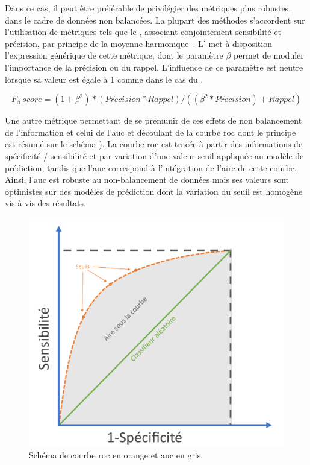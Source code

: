 Dans ce cas, il peut être préférable de privilégier des métriques plus robustes, dans le cadre de données non balancées. La plupart des méthodes s’accordent sur l’utilisation de métriques tels que le \fscore{}, associant conjointement sensibilité et précision, par principe de la moyenne harmonique~\cite{Guo2008}. L' met à disposition l'expression générique de cette métrique, dont le paramètre $\beta$ permet de moduler l'importance de la précision ou du rappel. L'influence de ce paramètre est neutre lorsque sa valeur est égale à 1 comme dans le cas du \fscore.\par
 
\begin{equation} 
    {F_\beta \: score}=(1+\beta^2)*(Pr\acute{e}cision*Rappel)/((\beta^2*Pr\acute{e}cision)+Rappel)
    \label{eq:metrics_fscore}
\end{equation}
 
Une autre métrique permettant de se prémunir de ces effets de non balancement de l'information et celui de l'\acs{auc} et découlant de la courbe \gls{roc} dont le principe est résumé sur le schéma ). La courbe \gls{roc} est tracée à partir des informations de spécificité / sensibilité et par variation d'une valeur seuil appliquée au modèle de prédiction, tandis que l'\gls{auc} correspond à l'intégration de l'aire de cette courbe. Ainsi, l'\gls{auc} est robuste au non-balancement de données mais ses valeurs sont optimistes sur des modèles de prédiction dont la variation du seuil est homogène vis à vis des résultats.\par

\begin{figure}[H]
    \centering
    \includegraphics[width=0.55\linewidth]{contents/chapter_3/resources/scheme_roc_curve.pdf}
    \caption{Schéma de courbe \gls{roc} en orange et \gls{auc} en gris.}
    \label{fig:scheme_roc_curve}
\end{figure}

